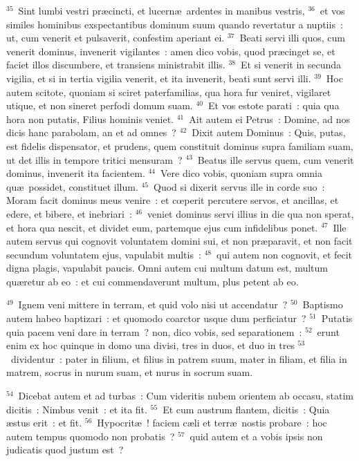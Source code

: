 ${}^{35}$~Sint lumbi vestri pr\ae cincti, et lucern\ae\ ardentes in manibus vestris,
${}^{36}$~et vos similes hominibus exspectantibus dominum suum quando revertatur a nuptiis~: ut, cum venerit et pulsaverit, confestim aperiant ei.
${}^{37}$~Beati servi illi quos, cum venerit dominus, invenerit vigilantes~: amen dico vobis, quod pr\ae cinget se, et faciet illos discumbere, et transiens ministrabit illis.
${}^{38}$~Et si venerit in secunda vigilia, et si in tertia vigilia venerit, et ita invenerit, beati sunt servi illi.
${}^{39}$~Hoc autem scitote, quoniam si sciret paterfamilias, qua hora fur veniret, vigilaret utique, et non sineret perfodi domum suam.
${}^{40}$~Et vos estote parati~: quia qua hora non putatis, Filius hominis veniet.
${}^{41}$~Ait autem ei Petrus~: Domine, ad nos dicis hanc parabolam, an et ad omnes~?
${}^{42}$~Dixit autem Dominus~: Quis, putas, est fidelis dispensator, et prudens, quem constituit dominus supra familiam suam, ut det illis in tempore tritici mensuram~?
${}^{43}$~Beatus ille servus quem, cum venerit dominus, invenerit ita facientem.
${}^{44}$~Vere dico vobis, quoniam supra omnia qu\ae\ possidet, constituet illum.
${}^{45}$~Quod si dixerit servus ille in corde suo~: Moram facit dominus meus venire~: et cœperit percutere servos, et ancillas, et edere, et bibere, et inebriari~:
${}^{46}$~veniet dominus servi illius in die qua non sperat, et hora qua nescit, et dividet eum, partemque ejus cum infidelibus ponet.
${}^{47}$~Ille autem servus qui cognovit voluntatem domini sui, et non pr\ae paravit, et non facit secundum voluntatem ejus, vapulabit multis~:
${}^{48}$~qui autem non cognovit, et fecit digna plagis, vapulabit paucis. Omni autem cui multum datum est, multum qu\ae retur ab eo~: et cui commendaverunt multum, plus petent ab eo.


${}^{49}$~Ignem veni mittere in terram, et quid volo nisi ut accendatur~?
${}^{50}$~Baptismo autem habeo baptizari~: et quomodo coarctor usque dum perficiatur~?
${}^{51}$~Putatis quia pacem veni dare in terram~? non, dico vobis, sed separationem~:
${}^{52}$~erunt enim ex hoc quinque in domo una divisi, tres in duos, et duo in tres
${}^{53}$~dividentur~: pater in filium, et filius in patrem suum, mater in filiam, et filia in matrem, socrus in nurum suam, et nurus in socrum suam.


${}^{54}$~Dicebat autem et ad turbas~: Cum videritis nubem orientem ab occasu, statim dicitis~: Nimbus venit~: et ita fit.
${}^{55}$~Et cum austrum flantem, dicitis~: Quia \ae stus erit~: et fit.
${}^{56}$~Hypocrit\ae~! faciem c\ae li et terr\ae\ nostis probare~: hoc autem tempus quomodo non probatis~?
${}^{57}$~quid autem et a vobis ipsis non judicatis quod justum est~?


